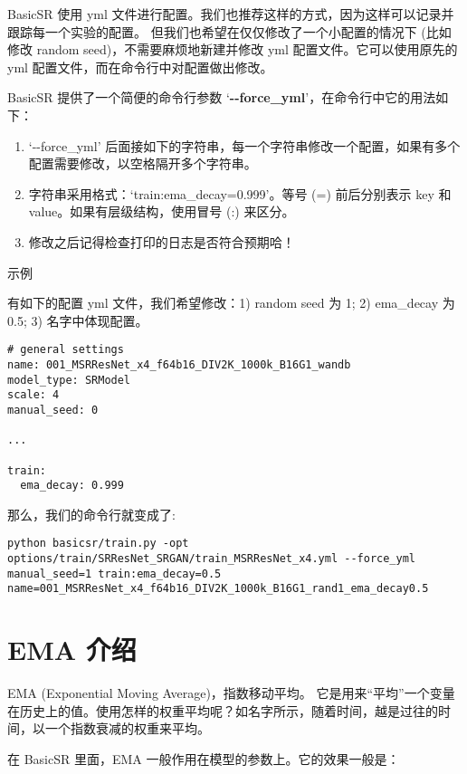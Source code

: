 \documentclass[../main.tex]{subfiles}
\begin{document}
BasicSR 使用 yml 文件进行配置。我们也推荐这样的方式，因为这样可以记录并跟踪每一个实验的配置。
但我们也希望在仅仅修改了一个小配置的情况下 (比如修改 random seed)，不需要麻烦地新建并修改 yml 配置文件。它可以使用原先的 yml 配置文件，而在命令行中对配置做出修改。

BasicSR 提供了一个简便的命令行参数 ‘\textbf{-{}-force\_yml}’，在命令行中它的用法如下：

\begin{enumerate}
	\item ‘-{}-force\_yml’ 后面接如下的字符串，每一个字符串修改一个配置，如果有多个配置需要修改，以空格隔开多个字符串。
	\item 字符串采用格式：‘train:ema\_decay=0.999’。等号 (=) 前后分别表示 key 和 value。如果有层级结构，使用冒号 (:) 来区分。
	\item 修改之后记得检查打印的日志是否符合预期哈！
\end{enumerate}

\begin{exampleBox}[]{示例}
	
	有如下的配置 yml 文件，我们希望修改：1) random seed 为 1; 2) ema\_decay 为0.5; 3) 名字中体现配置。 
	
	\begin{verbatim}
# general settings
name: 001_MSRResNet_x4_f64b16_DIV2K_1000k_B16G1_wandb
model_type: SRModel
scale: 4
manual_seed: 0

...

train:
  ema_decay: 0.999
	\end{verbatim}
	
	那么，我们的命令行就变成了:
	\begin{verbatim}
python basicsr/train.py -opt options/train/SRResNet_SRGAN/train_MSRResNet_x4.yml --force_yml manual_seed=1 train:ema_decay=0.5 name=001_MSRResNet_x4_f64b16_DIV2K_1000k_B16G1_rand1_ema_decay0.5
	\end{verbatim}
\end{exampleBox}


\section{EMA 介绍}

EMA (Exponential Moving Average)，指数移动平均。
它是用来“平均”一个变量在历史上的值。使用怎样的权重平均呢？如名字所示，随着时间，越是过往的时间，以一个指数衰减的权重来平均。

在 BasicSR 里面，EMA 一般作用在模型的参数上。它的效果一般是：
\end{document}
